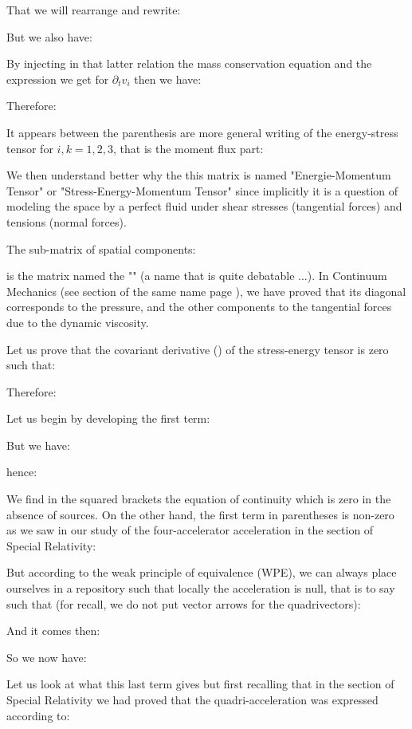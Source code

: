 	That we will rearrange and rewrite:
	
	But we also have:
	
	By injecting in that latter relation the mass conservation equation and the expression we get for $\partial_t v_i$ then we have:
	
	Therefore:
	
	It appears between the parenthesis are more general writing of the energy-stress tensor for $i,k=1,2,3$, that is the moment flux part:
	
	
	We then understand better why the this matrix is named "Energie-Momentum Tensor" or "Stress-Energy-Momentum Tensor" since implicitly it is a question of modeling the space by a perfect fluid under shear stresses (tangential forces) and tensions (normal forces).
	\begin{tcolorbox}[title=Remark,colframe=black,arc=10pt]
	The sub-matrix of spatial components:
	
	is the matrix named the "" (a name that is quite debatable ...). In Continuum Mechanics (see section of the same name page \pageref{navier stokes equations}), we have proved that its diagonal corresponds to the pressure, and the other components to the tangential forces due to the dynamic viscosity.
	\end{tcolorbox}
	Let us prove that the covariant derivative () of the stress-energy tensor is zero such that:
	
	Therefore:
	
	Let us begin by developing the first term:
	
	But we have:
	
	hence:
	
	We find in the squared brackets the equation of continuity which is zero in the absence of sources. On the other hand, the first term in parentheses is non-zero as we saw in our study of the four-accelerator acceleration in the section of Special Relativity:
	
	But according to the weak principle of equivalence (WPE), we can always place ourselves in a repository such that locally the acceleration is null, that is to say such that (for recall, we do not put vector arrows for the quadrivectors):
	
	And it comes then:
	
	So we now have:
	
	Let us look at what this last term gives but first recalling that in the section of Special Relativity we had proved that the quadri-acceleration was expressed according to:
	
